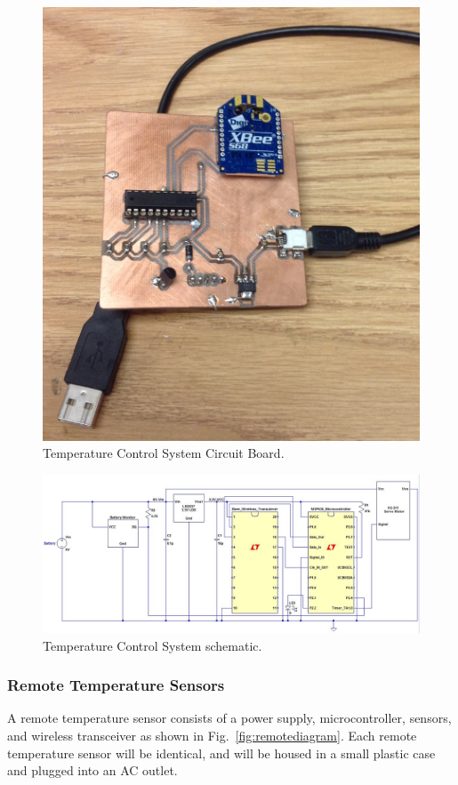\begin{figure} [htb]
\centering
\includegraphics[width=.99\textwidth]{Temp_Sense_Unit.JPG}
\caption{Temperature Control System Circuit Board.}
\label{fig:Temperature_System_Board}
\end{figure}

\begin{figure} [htb]
\centering
\includegraphics[width=.99\textwidth]{Temperature_Sensor.JPG}
\caption{Temperature Control System schematic.}
\label{fig:Temperature_System}
\end{figure}


\subsubsection{Remote Temperature Sensors}
A remote temperature sensor consists of a power supply, microcontroller, sensors, and wireless transceiver as shown in Fig.~\ref{fig:remotediagram}.  Each remote temperature sensor will be identical, and will be housed in a small plastic case and plugged into an AC outlet.
